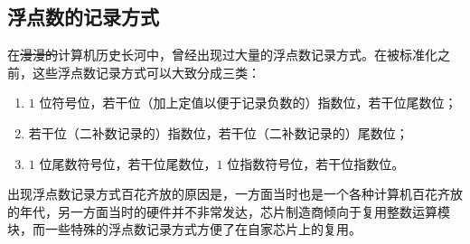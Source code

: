 \subsection{浮点数的记录方式}\label{subsec:NumberSystemBasics/FloatingPointNotations}
    在\sout{漫漫的}计算机历史长河中，曾经出现过大量的浮点数记录方式。在被标准化之前，这些浮点数记录方式可以大致分成三类\cite{jjgsavard-2005-cp0201}：
    \begin{enumerate}
        \item $1$ 位符号位，若干位（加上定值以便于记录负数的）指数位，若干位尾数位；
        \item 若干位（二补数记录的）指数位，若干位（二补数记录的）尾数位；
        \item $1$ 位尾数符号位，若干位尾数位，$1$ 位指数符号位，若干位指数位。
    \end{enumerate}
    出现浮点数记录方式百花齐放的原因是，一方面当时也是一个各种计算机百花齐放的年代，另一方面当时的硬件并不非常发达，芯片制造商倾向于复用整数运算模块，而一些特殊的浮点数记录方式方便了在自家芯片上的复用。
